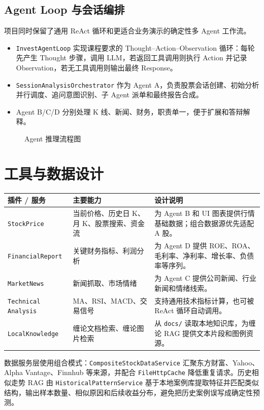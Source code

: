 \documentclass[UTF8,a4paper,11pt]{ctexart}
\begin{document}
\subsection{Agent Loop 与会话编排}
项目同时保留了通用 ReAct 循环和更适合业务演示的确定性多 Agent 工作流。

\begin{itemize}
  \item \texttt{InvestAgentLoop} 实现课程要求的 Thought--Action--Observation 循环：每轮先产生 Thought 步骤，调用 LLM，若返回工具调用则执行 Action 并记录 Observation，若无工具调用则输出最终 Response。
  \item \texttt{SessionAnalysisOrchestrator} 作为 Agent A，负责股票会话创建、初始分析并行调度、追问意图识别、子 Agent 派单和最终报告合成。
  \item Agent B/C/D 分别处理 K 线、新闻、财务，职责单一，便于扩展和答辩解释。
\end{itemize}

\begin{figure}[htbp]
\centering
\resizebox{\textwidth}{!}{
}
\caption{Agent 推理流程图}
\end{figure}

\section{工具与数据设计}
\begin{longtable}{p{3.2cm}p{4.2cm}p{7.2cm}}
\toprule
插件 / 服务 & 主要能力 & 设计说明\\
\midrule
\texttt{StockPrice} & 当前价格、历史日 K、月 K、股票搜索、资金流 & 为 Agent B 和 UI 图表提供行情基础数据；组合数据源优先适配 A 股。\\
\texttt{FinancialReport} & 关键财务指标、利润分析 & 为 Agent D 提供 ROE、ROA、毛利率、净利率、增长率、负债率等序列。\\
\texttt{MarketNews} & 新闻抓取、市场情绪 & 为 Agent C 提供公司新闻、行业新闻和情绪线索。\\
\texttt{Technical} \texttt{Analysis} & MA、RSI、MACD、交易信号 & 支持通用技术指标计算，也可被 ReAct 循环自动调用。\\
\texttt{LocalKnowledge} & 缠论文档检索、缠论图片检索 & 从 \texttt{docs/} 读取本地知识库，为缠论 RAG 提供文本片段和图例资源。\\
\bottomrule
\end{longtable}

数据服务层使用组合模式：\texttt{CompositeStockDataService} 汇聚东方财富、Yahoo、Alpha Vantage、Finnhub 等来源，并配合 \texttt{FileHttpCache} 降低重复请求。历史相似走势 RAG 由 \texttt{HistoricalPatternService} 基于本地案例库提取特征并匹配类似结构，输出样本数量、相似原因和后续收益分布，避免把历史案例误写成确定性预测。
\end{document}
